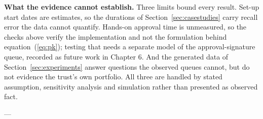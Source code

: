 \textbf{What the evidence cannot establish.} Three limits bound every result. Set-up start dates are estimates, so the durations of Section~\ref{sec:casestudies} carry recall error the data cannot quantify. Hands-on approval time is unmeasured, so the checks above verify the implementation and not the formulation behind equation~(\ref{eq:pk}); testing that needs a separate model of the approval-signature queue, recorded as future work in Chapter 6. And the generated data of Section~\ref{sec:experiments} answer questions the observed queues cannot, but do not evidence the trust's own portfolio. All three are handled by stated assumption, sensitivity analysis and simulation rather than presented as observed fact.

---

